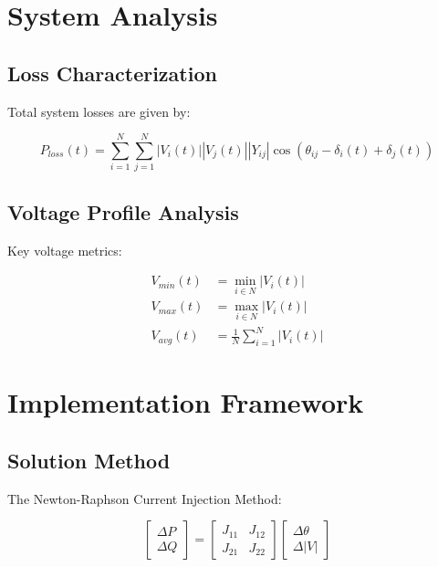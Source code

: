 \documentclass[11pt]{article}
\begin{document}
\section{System Analysis}

\subsection{Loss Characterization}
Total system losses are given by:

\begin{equation}
P_{loss}(t) = \sum_{i=1}^{N} \sum_{j=1}^{N} |V_i(t)||V_j(t)||Y_{ij}|\cos(\theta_{ij} - \delta_i(t) + \delta_j(t))
\end{equation}

\subsection{Voltage Profile Analysis}
Key voltage metrics:

\begin{equation}
\begin{aligned}
V_{min}(t) &= \min_{i \in N} |V_i(t)| \\
V_{max}(t) &= \max_{i \in N} |V_i(t)| \\
V_{avg}(t) &= \frac{1}{N}\sum_{i=1}^{N} |V_i(t)|
\end{aligned}
\end{equation}

\section{Implementation Framework}

\subsection{Solution Method}
The Newton-Raphson Current Injection Method:

\begin{equation}
\begin{bmatrix} \Delta P \\ \Delta Q \end{bmatrix} = 
\begin{bmatrix} J_{11} & J_{12} \\ J_{21} & J_{22} \end{bmatrix}
\begin{bmatrix} \Delta \theta \\ \Delta |V| \end{bmatrix}
\end{equation}
\end{document}
